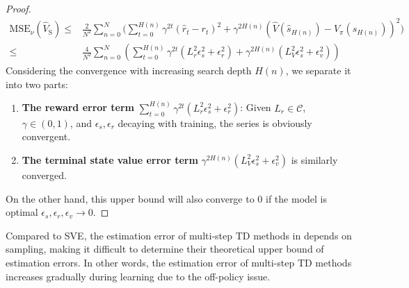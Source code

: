\begin{proof}
\begin{equation}
\begin{split}
    \text{MSE}_\nu(\hat{V}_\text{S})\leq& \frac{2}{N^2}\sum_{n=0}^N\Bigg(\sum_{t=0}^{H(n)}\gamma^{2t}(\hat{r}_t-r_t)^2+
    \gamma^{2H(n)}\left(\hat{V}(\hat{s}_{H(n)})-V_\pi(s_{H(n)})\right)^2\Bigg)\\
\leq&
\frac{4}{N^2}\sum_{n=0}^N\left(\sum_{t=0}^{H(n)}\gamma^{2t}(L_r^2\epsilon_s^2+\epsilon_r^2)+\gamma^{2H(n)}(L_V^2\epsilon_s^2+\epsilon_v^2)\right)
\end{split}
\end{equation}
Considering the convergence
with increasing search depth $H(n)$, we separate it into two parts:
\begin{enumerate}
    \item \textbf{The reward error term} $\sum_{t=0}^{H(n)}\gamma^{2t}(L_r^2\epsilon_s^2+\epsilon_r^2)$:
    Given $L_r\in \mathcal{C}$, $\gamma\in(0,1)$, and $\epsilon_s,\epsilon_r$ decaying with training, the series is obviously convergent.
    \item \textbf{The terminal state value error term} $\gamma^{2H(n)}(L_V^2\epsilon_s^2+\epsilon_v^2)$ is similarly converged. 
\end{enumerate}
On the other hand, this upper bound will also converge to 0 if the model is optimal $\epsilon_s,\epsilon_r,\epsilon_v\to0$.
\end{proof}

Compared to SVE, the estimation error of multi-step TD methods in \citep{de2018multi} depends on sampling, making it difficult to determine their theoretical upper bound of estimation errors. In other words, the estimation error of multi-step TD methods increases gradually during learning due to the off-policy issue.


